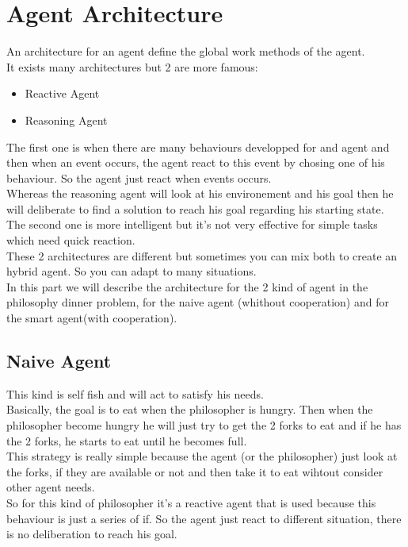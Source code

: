 \section{Agent Architecture}

An architecture for an agent define the global work methods of the agent.\\
It exists many architectures but 2 are more famous:\\
\begin{itemize}
	\item Reactive Agent
	\item Reasoning Agent
\end{itemize}
The first one is when there are many behaviours developped for and agent and then when an event occurs, the agent react to this event by chosing one of his behaviour. So the agent just react when events occurs.\\
Whereas the reasoning agent will look at his environement and his goal then he will deliberate to find a solution to reach his goal regarding his starting state.\\
The second one is more intelligent but it's not very effective for simple tasks which need quick reaction.\\
These 2 architectures are different but sometimes you can mix both to create an hybrid agent. So you can adapt to many situations.\\
In this part we will describe the architecture for the 2 kind of agent in the philosophy dinner problem, for the naive agent (whithout cooperation) and for the smart agent(with cooperation).

\subsection{Naive Agent}
This kind is self fish and will act to satisfy his needs.\\
Basically, the goal is to eat when the philosopher is hungry. Then when the philosopher become hungry he will just try to get the 2 forks to eat and if he has the 2 forks, he starts to eat until he becomes full.\\
This strategy is really simple because the agent (or the philosopher) just look at the forks, if they are available or not and then take it to eat wihtout consider other agent needs.\\
So for this kind of philosopher it's a reactive agent that is used because this behaviour is just a series of if. So the agent just react to different situation, there is no deliberation to reach his goal.

